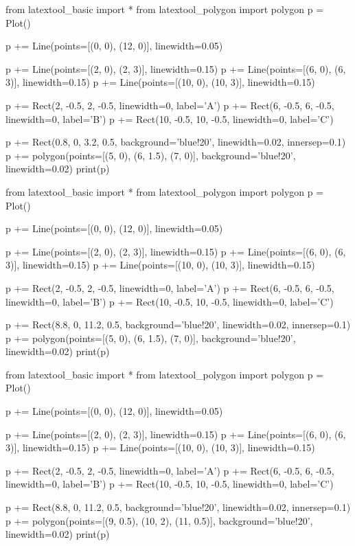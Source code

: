 \begin{python}
from latextool_basic import *
from latextool_polygon import polygon
p = Plot()

p += Line(points=[(0, 0), (12, 0)], linewidth=0.05)

p += Line(points=[(2, 0), (2, 3)], linewidth=0.15)
p += Line(points=[(6, 0), (6, 3)], linewidth=0.15)
p += Line(points=[(10, 0), (10, 3)], linewidth=0.15)

p += Rect(2, -0.5, 2, -0.5, linewidth=0, label='A')
p += Rect(6, -0.5, 6, -0.5, linewidth=0, label='B')
p += Rect(10, -0.5, 10, -0.5, linewidth=0, label='C')

p += Rect(0.8, 0, 3.2, 0.5, background='blue!20', linewidth=0.02, innersep=0.1)  
p += polygon(points=[(5, 0), (6, 1.5), (7, 0)], background='blue!20', linewidth=0.02)
print(p)
\end{python}

\begin{python}
from latextool_basic import *
from latextool_polygon import polygon
p = Plot()

p += Line(points=[(0, 0), (12, 0)], linewidth=0.05)

p += Line(points=[(2, 0), (2, 3)], linewidth=0.15)
p += Line(points=[(6, 0), (6, 3)], linewidth=0.15)
p += Line(points=[(10, 0), (10, 3)], linewidth=0.15)

p += Rect(2, -0.5, 2, -0.5, linewidth=0, label='A')
p += Rect(6, -0.5, 6, -0.5, linewidth=0, label='B')
p += Rect(10, -0.5, 10, -0.5, linewidth=0, label='C')

p += Rect(8.8, 0, 11.2, 0.5, background='blue!20', linewidth=0.02, innersep=0.1)  
p += polygon(points=[(5, 0), (6, 1.5), (7, 0)], background='blue!20', linewidth=0.02)
print(p)
\end{python}

\begin{python}
from latextool_basic import *
from latextool_polygon import polygon
p = Plot()

p += Line(points=[(0, 0), (12, 0)], linewidth=0.05)

p += Line(points=[(2, 0), (2, 3)], linewidth=0.15)
p += Line(points=[(6, 0), (6, 3)], linewidth=0.15)
p += Line(points=[(10, 0), (10, 3)], linewidth=0.15)

p += Rect(2, -0.5, 2, -0.5, linewidth=0, label='A')
p += Rect(6, -0.5, 6, -0.5, linewidth=0, label='B')
p += Rect(10, -0.5, 10, -0.5, linewidth=0, label='C')

p += Rect(8.8, 0, 11.2, 0.5, background='blue!20', linewidth=0.02, innersep=0.1)  
p += polygon(points=[(9, 0.5), (10, 2), (11, 0.5)], background='blue!20', linewidth=0.02)
print(p)
\end{python}

